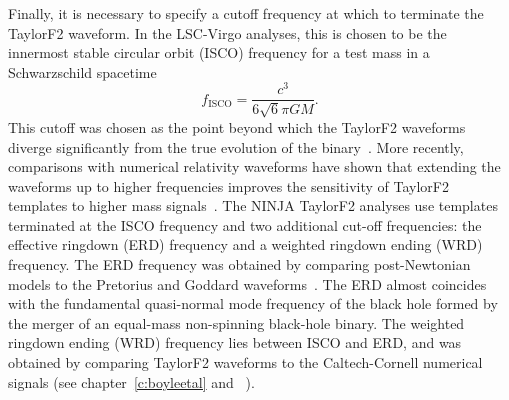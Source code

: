 Finally, it is necessary to specify a cutoff frequency at which to
terminate the TaylorF2 waveform. In the LSC-Virgo analyses, this is
chosen to be the innermost stable circular orbit (ISCO) frequency for
a test mass in a Schwarzschild spacetime 
%
\begin{equation} \label{f_ISCO} f_\mathrm{ISCO} =
\frac{c^3}{6\sqrt{6}\pi GM}.  \end{equation}
%
This cutoff was chosen as the point beyond which the TaylorF2
waveforms diverge significantly from the true evolution of the
binary~\cite{Blanchet:2002av}.  More recently, comparisons with
numerical relativity waveforms have shown that extending the waveforms
up to higher frequencies improves the sensitivity of TaylorF2
templates to higher mass signals~\cite{Pan:2007nw,Boyle:2009dg}. The
NINJA TaylorF2 analyses use templates terminated at the ISCO frequency
and two additional cut-off frequencies: the effective ringdown (ERD)
frequency and a weighted ringdown ending (WRD) frequency. The ERD
frequency was obtained by comparing post-Newtonian models to the
Pretorius and Goddard waveforms~\cite{Pan:2007nw}. The ERD almost
coincides with the fundamental quasi-normal mode frequency of the
black hole formed by the merger of an equal-mass non-spinning
black-hole binary. The weighted ringdown ending (WRD) frequency lies
between ISCO and ERD, and was obtained by comparing TaylorF2 waveforms
to the Caltech-Cornell numerical signals (see
chapter~\ref{c:boyleetal}  and ~\cite{Boyle:2009dg}).

